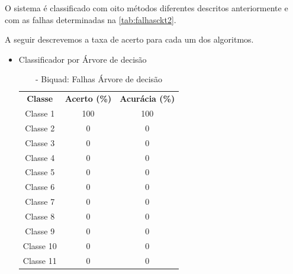 O sistema é classificado com oito métodos diferentes descritos anteriormente e com as falhas determinadas na \ref{tab:falhasckt2}. 

A seguir descrevemos a taxa de acerto para cada um dos algoritmos. 


\begin{itemize}
\newpage
 \item Classificador por Árvore de decisão
 
\begin{table}[ht]
\centering
\begin{tabular}{ccc}
\textbf{Classe} & \textbf{Acerto (\%)} & \textbf{Acurácia (\%)} \\
Classe 1        & 100                  & 100                    \\
Classe 2        & 0                  & 0                    \\
Classe 3        & 0                  & 0                    \\
Classe 4        & 0                  & 0                    \\
Classe 5        & 0                  & 0                    \\
Classe 6        & 0                  & 0                    \\
Classe 7        & 0                  & 0                    \\
Classe 8        & 0                  & 0                    \\
Classe 9        & 0                  & 0                    \\
Classe 10       & 0                  & 0                    \\
Classe 11       & 0                  & 0                                       
\end{tabular}
\caption{\label{tab:Biqnarvore}- Biquad: Falhas Árvore de decisão}
\end{table}


\end{itemize}
